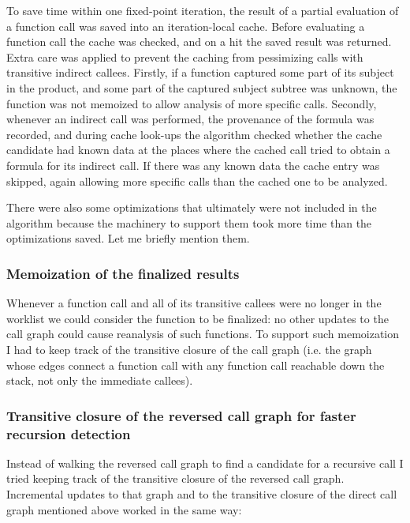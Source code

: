 \documentclass[twoside]{article}
\begin{document}
To save time within one fixed-point iteration, the result of a partial evaluation of a function call was saved into an iteration-local cache. Before evaluating a function call the cache was checked, and on a hit the saved result was returned. Extra care was applied to prevent the caching from pessimizing calls with transitive indirect callees. Firstly, if a function captured some part of its subject in the product, and some part of the captured subject subtree was unknown, the function was not memoized to allow analysis of more specific calls. Secondly, whenever an indirect call was performed, the provenance of the formula was recorded, and during cache look-ups the algorithm checked whether the cache candidate had known data at the places where the cached call tried to obtain a formula for its indirect call. If there was any known data the cache entry was skipped, again allowing more specific calls than the cached one to be analyzed.

There were also some optimizations that ultimately were not included in the algorithm because the machinery to support them took more time than the optimizations saved. Let me briefly mention them.

\subsubsection{Memoization of the finalized results}

Whenever a function call and all of its transitive callees were no longer in the worklist we could consider the function to be finalized: no other updates to the call graph could cause reanalysis of such functions. To support such memoization I had to keep track of the transitive closure of the call graph (i.e. the graph whose edges connect a function call with any function call reachable down the stack, not only the immediate callees).

\subsubsection{Transitive closure of the reversed call graph for faster recursion detection}

Instead of walking the reversed call graph to find a candidate for a recursive call I tried keeping track of the transitive closure of the reversed call graph. Incremental updates to that graph and to the transitive closure of the direct call graph mentioned above worked in the same way:
\end{document}
